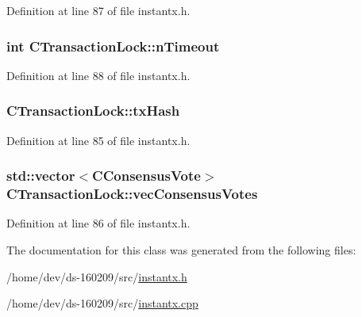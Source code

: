 Definition at line 87 of file instantx.\+h.

\hypertarget{class_c_transaction_lock_a8c18d2530bfcea24bee8d5773d12c0a9}{}
\subsubsection[{n\+Timeout}]{\setlength{\rightskip}{0pt plus 5cm}int C\+Transaction\+Lock\+::n\+Timeout}\label{class_c_transaction_lock_a8c18d2530bfcea24bee8d5773d12c0a9}


Definition at line 88 of file instantx.\+h.

\hypertarget{class_c_transaction_lock_a9d4babccfcdf7fe3806dd3ec1b56d08a}{}
\subsubsection[{tx\+Hash}]{ C\+Transaction\+Lock\+::tx\+Hash}\label{class_c_transaction_lock_a9d4babccfcdf7fe3806dd3ec1b56d08a}


Definition at line 85 of file instantx.\+h.

\hypertarget{class_c_transaction_lock_a399f0d14a38794034c5f530599e95b3a}{}
\subsubsection[{vec\+Consensus\+Votes}]{\setlength{\rightskip}{0pt plus 5cm}std\+::vector$<${\bf C\+Consensus\+Vote}$>$ C\+Transaction\+Lock\+::vec\+Consensus\+Votes}\label{class_c_transaction_lock_a399f0d14a38794034c5f530599e95b3a}


Definition at line 86 of file instantx.\+h.



The documentation for this class was generated from the following files\+:\begin{DoxyCompactItemize}
\item 
/home/dev/ds-\/160209/src/\hyperlink{instantx_8h}{instantx.\+h}\item 
/home/dev/ds-\/160209/src/\hyperlink{instantx_8cpp}{instantx.\+cpp}\end{DoxyCompactItemize}
